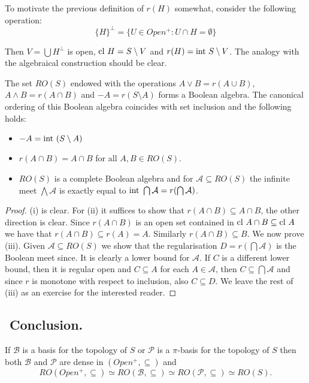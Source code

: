 To motivate the previous definition of $r(H)$ somewhat, consider the following operation:
$$ %
 \{H\}^{\perp} =\{U\in Open^{+}:U\cap H=\emptyset\}
$$ %

Then $V=\bigcup H^{\perp}$ is open, $\hbox{cl}\ H=S\setminus V$ and $r(H)=\hbox{int}\ S\setminus V$. The analogy with
the algebraical construction should be clear.

\begin{theorem}The set $RO(S)$ endowed with the operations $A\vee B=r(A\cup B)$, $A\wedge B=r(A\cap B)$ and $-A=r(S\setminus A)$
 forms a Boolean algebra. The canonical ordering of this Boolean algebra coincides with set inclusion and the following
 holds:
 \begin{itemize}
  \item[(i)]  $-A=\hbox{int}\ (S\setminus A)$
  \item[(ii)]  $r(A\cap B)=A\cap B$ for all $A,B\in RO(S)$.
  \item[(iii)]  $RO(S)$ is a complete Boolean algebra and for ${\mathcal A}\subseteq RO(S)$ the infinite meet
  $\bigwedge{\mathcal A}$ is exactly equal to $\hbox{int}\ \bigcap{\mathcal A}=r(\bigcap{\mathcal A})$.
 \end{itemize}
\end{theorem}


\begin{proof} (i) is clear. For (ii) it suffices to show that $r(A\cap B)\subseteq A\cap B$, the other direction is clear.
Since $r(A\cap B)$ is an open set contained in $\hbox{cl}\ A\cap B\subseteq\hbox{cl}\ A$ we have that $r(A\cap B)\subseteq r(A)=A$.
Similarly $r(A\cap B)\subseteq B$.
 We now prove (iii). Given ${\mathcal A}\subseteq RO(S)$ we show that the regularisation $D=r(\bigcap{\mathcal A})$ is
 the Boolean meet since. It is clearly a lower bound for ${\mathcal A}$. If $C$ is a different lower bound, then it is regular open and $C\subseteq A$
 for each $A\in{\mathcal A}$, then $C\subseteq \bigcap{\mathcal A}$ and since $r$ is monotone with respect to inclusion, also $C\subseteq D$. We leave
 the rest of (iii) as an exercise for the interested reader.
\end{proof}

\subsection{${}$ \hspace{-1em}Conclusion.}
If ${\mathcal B}$ is a basis for the topology of $S$ or ${\mathcal P}$ is a $\pi$-basis for the topology of $S$ then
both ${\mathcal B}$ and ${\mathcal P}$ are dense in $(Open^{+},\subseteq)$ and
$$RO(Open^{+},\subseteq)\simeq RO({\mathcal B},\subseteq)\simeq RO({\mathcal P},\subseteq)\simeq RO(S).$$


